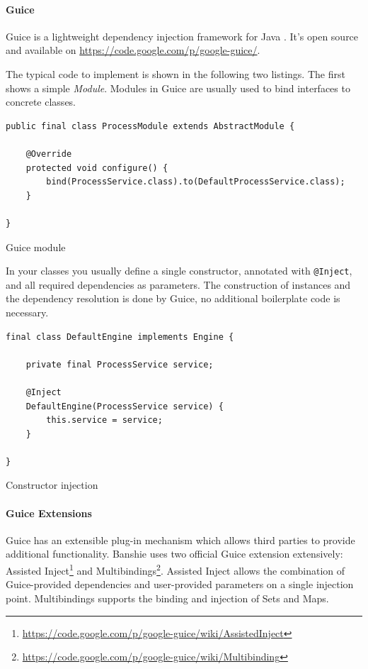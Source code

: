 \paragraph{Guice}
Guice is a lightweight dependency injection framework for Java \cite{Guice}. It's open source and available on \url{https://code.google.com/p/google-guice/}.

The typical code to implement is shown in the following two listings. The first shows a simple \textit{Module}. Modules in Guice are usually used to bind interfaces to concrete classes.

\begin{listing}[H]
\begin{verbatim}
public final class ProcessModule extends AbstractModule {

    @Override 
    protected void configure() {
        bind(ProcessService.class).to(DefaultProcessService.class);
    }

}
\end{verbatim}
\caption{Guice module}
\end{listing}

In your classes you usually define a single constructor, annotated with \texttt{@Inject}, and all required dependencies as parameters. The construction of instances and the dependency resolution is done by Guice, no additional boilerplate code is necessary.

\begin{listing}[H]
\begin{verbatim}
final class DefaultEngine implements Engine {

    private final ProcessService service;

    @Inject
    DefaultEngine(ProcessService service) {
        this.service = service;
    }

}
\end{verbatim}
\caption{Constructor injection}
\end{listing}

\paragraph{Guice Extensions}
Guice has an extensible plug-in mechanism which allows third parties to provide additional functionality. Banshie uses two official Guice extension extensively: Assisted Inject\footnote{\url{https://code.google.com/p/google-guice/wiki/AssistedInject}} and Multibindings\footnote{\url{https://code.google.com/p/google-guice/wiki/Multibinding}}. Assisted Inject allows the combination of Guice-provided dependencies and user-provided parameters on a single injection point. Multibindings supports the binding and injection of Sets and Maps.

